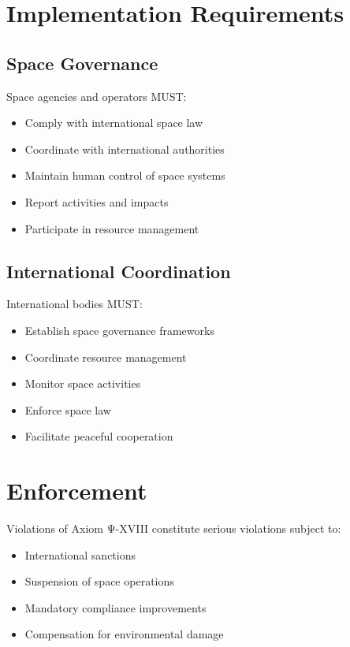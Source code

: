 \vspace{0.5cm}

\section{Implementation Requirements}

\subsection{Space Governance}

Space agencies and operators MUST:

\begin{itemize}
    \item Comply with international space law
    \item Coordinate with international authorities
    \item Maintain human control of space systems
    \item Report activities and impacts
    \item Participate in resource management
\end{itemize}

\subsection{International Coordination}

International bodies MUST:

\begin{itemize}
    \item Establish space governance frameworks
    \item Coordinate resource management
    \item Monitor space activities
    \item Enforce space law
    \item Facilitate peaceful cooperation
\end{itemize}

\vspace{0.5cm}

\section{Enforcement}

Violations of Axiom Ψ-XVIII constitute serious violations subject to:

\begin{itemize}
    \item International sanctions
    \item Suspension of space operations
    \item Mandatory compliance improvements
    \item Compensation for environmental damage
\end{itemize}


